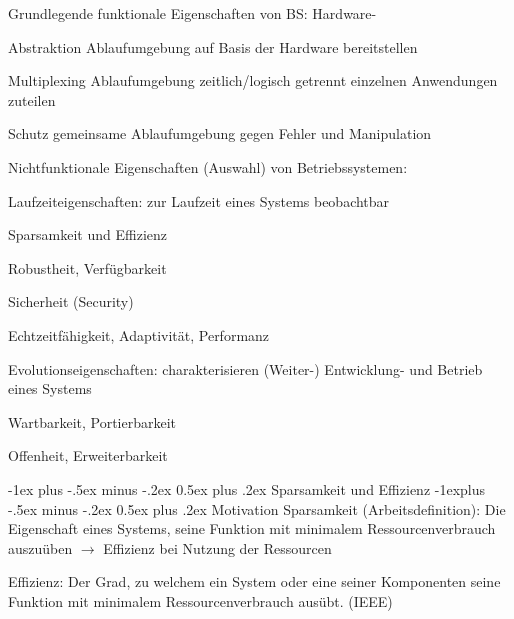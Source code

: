 \documentclass[a4paper]{article}
\makeatletter
\renewcommand{\section}{\@startsection{section}{1}{0mm}%
 {-1ex plus -.5ex minus -.2ex}%
 {0.5ex plus .2ex}%
 {\normalfont\large\bfseries}}
\renewcommand{\subsection}{\@startsection{subsection}{2}{0mm}%
 {-1explus -.5ex minus -.2ex}%
 {0.5ex plus .2ex}%
 {\normalfont\normalsize\bfseries}}
\makeatother
\begin{document}
\begin{multicols}{3}
    Grundlegende funktionale Eigenschaften von BS: Hardware-
    \begin{description*}
        \item[Abstraktion] Ablaufumgebung auf Basis der Hardware bereitstellen
        \item[Multiplexing] Ablaufumgebung zeitlich/logisch getrennt einzelnen Anwendungen zuteilen
        \item[Schutz] gemeinsame Ablaufumgebung gegen Fehler und Manipulation
    \end{description*}

    Nichtfunktionale Eigenschaften (Auswahl) von Betriebssystemen:
    \begin{itemize*}
        \item Laufzeiteigenschaften: zur Laufzeit eines Systems beobachtbar
        \begin{itemize*}
            \item Sparsamkeit und Effizienz
            \item Robustheit, Verfügbarkeit
            \item Sicherheit (Security)
            \item Echtzeitfähigkeit, Adaptivität, Performanz
        \end{itemize*}
        \item Evolutionseigenschaften: charakterisieren (Weiter-) Entwicklung- und Betrieb eines Systems
        \begin{itemize*}
            \item Wartbarkeit, Portierbarkeit
            \item Offenheit, Erweiterbarkeit
        \end{itemize*}
    \end{itemize*}

    \section{Sparsamkeit und Effizienz}
    \subsection{Motivation}
    Sparsamkeit (Arbeitsdefinition): Die Eigenschaft eines Systems, seine
    Funktion mit minimalem Ressourcenverbrauch auszuüben $\rightarrow$ Effizienz bei Nutzung der Ressourcen

    Effizienz: Der Grad, zu welchem ein System oder eine seiner Komponenten
    seine Funktion mit minimalem Ressourcenverbrauch ausübt. (IEEE)


\end{multicols}
\end{document}
